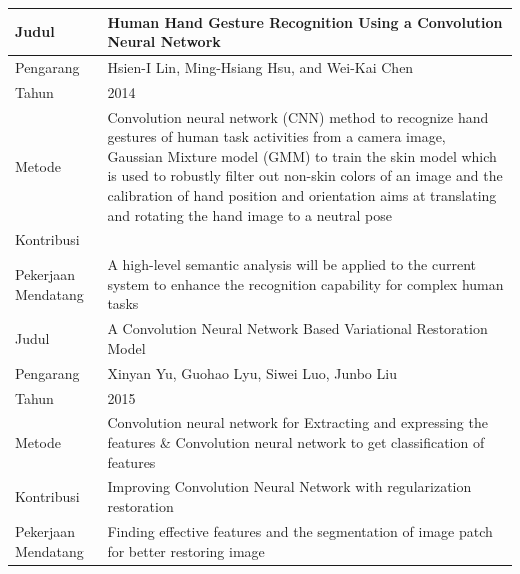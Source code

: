 \begin{table}
\begin{tabular}{ |m{2cm}|m{7cm}|m{1cm}|m{1cm}| }
		Judul & \multicolumn{3}{|m{13cm}|}{Human Hand Gesture Recognition Using a Convolution Neural Network} \\
		\hline
		Pengarang & \multicolumn{3}{|m{13cm}|}{Hsien-I Lin, Ming-Hsiang Hsu, and Wei-Kai Chen} \\ 
		\hline
		Tahun & \multicolumn{3}{|m{13cm}|}{2014} \\ 
		\hline
		Metode & \multicolumn{3}{|m{13cm}|}{Convolution neural network (CNN) method to recognize hand gestures of human task activities from a camera image, Gaussian Mixture model (GMM) to train the skin model which is used to robustly filter out non-skin colors of an image and the calibration of hand position and orientation aims at translating and rotating the hand image to a neutral pose
			}\\
		\hline
		Kontribusi  & \multicolumn{3}{|m{13cm}|}{}\\ 
		\hline
		Pekerjaan Mendatang  & \multicolumn{3}{|m{13cm}|}{A high-level semantic analysis will be applied to the current system to enhance the recognition capability for complex human tasks} \\ 
		\hline\hline
		
		Judul & \multicolumn{3}{|m{13cm}|}{A Convolution Neural Network Based Variational Restoration Model} \\
		\hline
		Pengarang & \multicolumn{3}{|m{13cm}|}{Xinyan Yu, Guohao Lyu, Siwei Luo, Junbo Liu} \\ 
		\hline
		Tahun & \multicolumn{3}{|m{13cm}|}{2015} \\ 
		\hline
		Metode & \multicolumn{3}{|m{13cm}|}{Convolution neural network for Extracting and expressing the features \& Convolution neural network to get classification of features
		}\\
		\hline
		Kontribusi  & \multicolumn{3}{|m{13cm}|}{Improving Convolution Neural Network with regularization restoration}\\ 
		\hline
		Pekerjaan Mendatang  & \multicolumn{3}{|m{13cm}|}{Finding effective features and the segmentation of image patch for better restoring image} \\
	\end{tabular}
\end{table}

